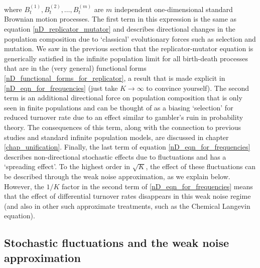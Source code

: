 where $B^{(1)}_t,B^{(2)}_t, \ldots, B^{(m)}_t$ are $m$ independent one-dimensional standard Brownian motion processes. The first term in this expression is the same as equation \eqref{nD_replicator_mutator} and describes directional changes in the population composition due to `classical' evolutionary forces such as selection and mutation. We saw in the previous section that the replicator-mutator equation is generically satisfied in the infinite population limit for all birth-death processes that are in the (very general) functional forms \eqref{nD_functional_forms_for_replicator}, a result that is made explicit in \eqref{nD_eqn_for_frequencies} (just take $K \to \infty$ to convince yourself). The second term is an additional directional force on population composition that is only seen in finite populations and can be thought of as a biasing `selection' for reduced turnover rate due to an effect similar to gambler's ruin in probability theory. The consequences of this term, along with the connection to previous studies and standard infinite population models, are discussed in chapter \ref{chap_unification}. Finally, the last term of equation \eqref{nD_eqn_for_frequencies} describes non-directional stochastic effects due to fluctuations and has a `spreading effect'. To the highest order in $\sqrt{K}$, the effect of these fluctuations can be described through the weak noise approximation, as we explain below. However, the $1/K$ factor in the second term of \eqref{nD_eqn_for_frequencies} means that the effect of differential turnover rates disappears in this weak noise regime  (and also in other such approximate treatments, such as the Chemical Langevin equation).

\subsection{Stochastic fluctuations and the weak noise approximation}


